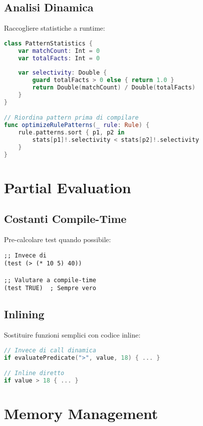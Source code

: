 \subsection{Analisi Dinamica}

Raccogliere statistiche a runtime:

\begin{lstlisting}[language=Swift]
class PatternStatistics {
    var matchCount: Int = 0
    var totalFacts: Int = 0
    
    var selectivity: Double {
        guard totalFacts > 0 else { return 1.0 }
        return Double(matchCount) / Double(totalFacts)
    }
}

// Riordina pattern prima di compilare
func optimizeRulePatterns(_ rule: Rule) {
    rule.patterns.sort { p1, p2 in
        stats[p1]!.selectivity < stats[p2]!.selectivity
    }
}
\end{lstlisting}

\section{Partial Evaluation}

\subsection{Costanti Compile-Time}

Pre-calcolare test quando possibile:

\begin{lstlisting}[language=CLIPS]
;; Invece di
(test (> (* 10 5) 40))

;; Valutare a compile-time
(test TRUE)  ; Sempre vero
\end{lstlisting}

\subsection{Inlining}

Sostituire funzioni semplici con codice inline:

\begin{lstlisting}[language=Swift]
// Invece di call dinamica
if evaluatePredicate(">", value, 18) { ... }

// Inline diretto
if value > 18 { ... }
\end{lstlisting}

\section{Memory Management}

